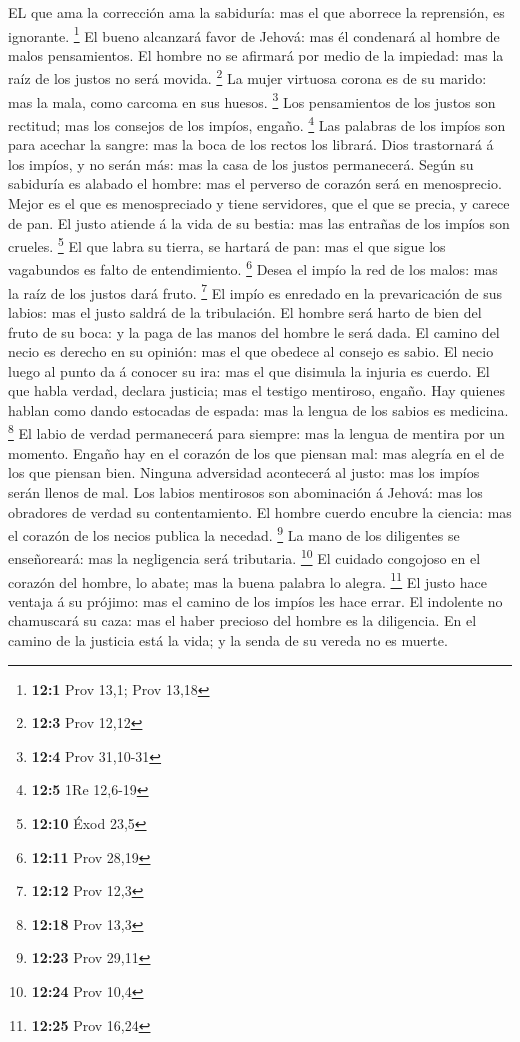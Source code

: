  EL que ama la corrección ama la sabiduría: mas el que
aborrece la reprensión, es ignorante. \footnote{\textbf{12:1} Prov 13,1;
  Prov 13,18}  El bueno alcanzará favor de Jehová: mas él
condenará al hombre de malos pensamientos.  El hombre no se
afirmará por medio de la impiedad: mas la raíz de los justos no será
movida. \footnote{\textbf{12:3} Prov 12,12}  La mujer
virtuosa corona es de su marido: mas la mala, como carcoma en sus
huesos. \footnote{\textbf{12:4} Prov 31,10-31}  Los
pensamientos de los justos son rectitud; mas los consejos de los impíos,
engaño. \footnote{\textbf{12:5} 1Re 12,6-19}  Las palabras
de los impíos son para acechar la sangre: mas la boca de los rectos los
librará.  Dios trastornará á los impíos, y no serán más: mas
la casa de los justos permanecerá.  Según su sabiduría es
alabado el hombre: mas el perverso de corazón será en menosprecio.
 Mejor es el que es menospreciado y tiene servidores, que el
que se precia, y carece de pan.  El justo atiende á la vida
de su bestia: mas las entrañas de los impíos son crueles. \footnote{\textbf{12:10}
  Éxod 23,5}  El que labra su tierra, se hartará de pan:
mas el que sigue los vagabundos es falto de entendimiento. \footnote{\textbf{12:11}
  Prov 28,19}  Desea el impío la red de los malos: mas la
raíz de los justos dará fruto. \footnote{\textbf{12:12} Prov 12,3}
 El impío es enredado en la prevaricación de sus labios:
mas el justo saldrá de la tribulación.  El hombre será
harto de bien del fruto de su boca: y la paga de las manos del hombre le
será dada.  El camino del necio es derecho en su opinión:
mas el que obedece al consejo es sabio.  El necio luego al
punto da á conocer su ira: mas el que disimula la injuria es cuerdo.
 El que habla verdad, declara justicia; mas el testigo
mentiroso, engaño.  Hay quienes hablan como dando estocadas
de espada: mas la lengua de los sabios es medicina. \footnote{\textbf{12:18}
  Prov 13,3}  El labio de verdad permanecerá para siempre:
mas la lengua de mentira por un momento.  Engaño hay en el
corazón de los que piensan mal: mas alegría en el de los que piensan
bien.  Ninguna adversidad acontecerá al justo: mas los
impíos serán llenos de mal.  Los labios mentirosos son
abominación á Jehová: mas los obradores de verdad su contentamiento.
 El hombre cuerdo encubre la ciencia: mas el corazón de los
necios publica la necedad. \footnote{\textbf{12:23} Prov 29,11}
 La mano de los diligentes se enseñoreará: mas la
negligencia será tributaria. \footnote{\textbf{12:24} Prov 10,4}
 El cuidado congojoso en el corazón del hombre, lo abate;
mas la buena palabra lo alegra. \footnote{\textbf{12:25} Prov 16,24}
 El justo hace ventaja á su prójimo: mas el camino de los
impíos les hace errar.  El indolente no chamuscará su caza:
mas el haber precioso del hombre es la diligencia.  En el
camino de la justicia está la vida; y la senda de su vereda no es
muerte.

